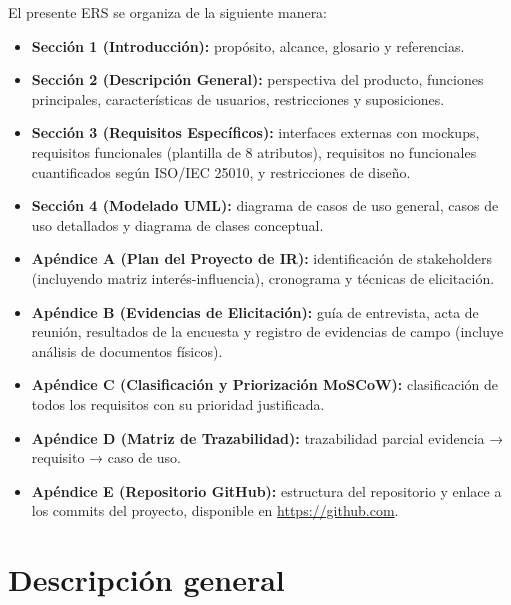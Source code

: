 \documentclass[11pt,a4paper]{article}
\begin{document}
El presente ERS se organiza de la siguiente manera:

\begin{itemize}
    \item \textbf{Sección 1 (Introducción):} propósito, alcance, glosario y referencias.
    
    \item \textbf{Sección 2 (Descripción General):} perspectiva del producto, funciones principales, características de usuarios, restricciones y suposiciones.
    
    \item \textbf{Sección 3 (Requisitos Específicos):} interfaces externas con mockups, requisitos funcionales (plantilla de 8 atributos), requisitos no funcionales cuantificados según ISO/IEC 25010, y restricciones de diseño.
    
    \item \textbf{Sección 4 (Modelado UML):} diagrama de casos de uso general, casos de uso detallados y diagrama de clases conceptual.
    
    \item \textbf{Apéndice A (Plan del Proyecto de IR):} identificación de stakeholders (incluyendo matriz interés-influencia), cronograma y técnicas de elicitación.
    
    \item \textbf{Apéndice B (Evidencias de Elicitación):} guía de entrevista, acta de reunión, resultados de la encuesta y registro de evidencias de campo (incluye análisis de documentos físicos).
    
    \item \textbf{Apéndice C (Clasificación y Priorización MoSCoW):} clasificación de todos los requisitos con su prioridad justificada.
    
    \item \textbf{Apéndice D (Matriz de Trazabilidad):} trazabilidad parcial evidencia → requisito → caso de uso.
    
    \item \textbf{Apéndice E (Repositorio GitHub):} estructura del repositorio y enlace a los commits del proyecto, disponible en \url{https://github.com}.
    
\end{itemize}


\section{Descripción general}
\end{document}

